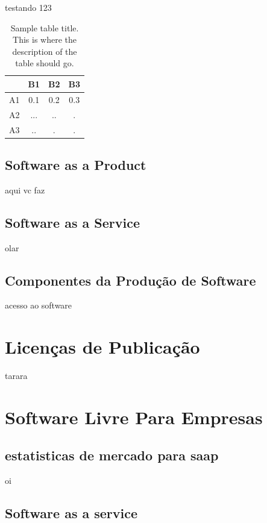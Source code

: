\documentclass{classe_cn}                 %
\begin{document}
testando 123

\begin{table}[h!]
\label{tag_tabela_01}
\caption{Sample table title. This is where the description of the table should go.}
  \begin{tabular}{cccc}
  \hline
       & B1   & B2   & B3   \\ \hline
   A1  & 0.1  & 0.2  & 0.3  \\
   A2  & ...  & ..   & .    \\
   A3  & ..   & .    & .    \\ \hline
  \end{tabular}
\end{table}

\subsection{Software as a Product}

aqui vc faz

\subsection{Software as a Service}

olar

\subsection{Componentes da Produção de Software}

acesso ao software

\section{Licenças de Publicação}

tarara

\section{Software Livre Para Empresas}


\subsection{estatisticas de mercado para saap}
oi


\subsection{Software as a service}
\end{document}
